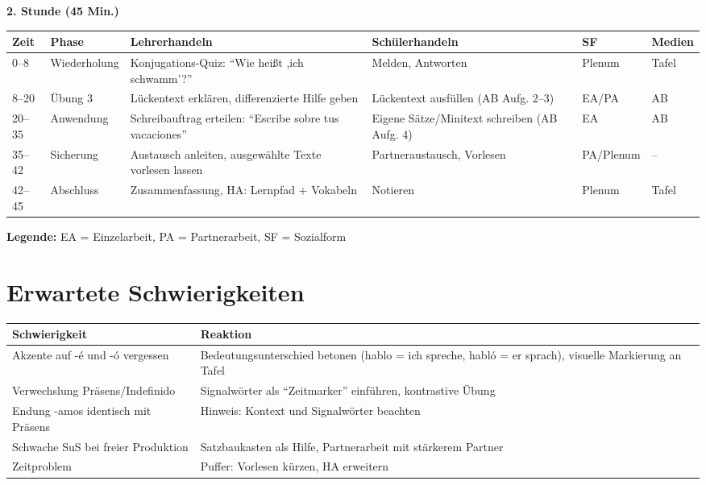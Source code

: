 \documentclass[11pt,a4paper]{article}
\begin{document}
\vspace{1em}

\textbf{2. Stunde (45 Min.)}

\begin{longtable}{|p{1cm}|p{1.5cm}|p{4cm}|p{3cm}|p{2cm}|p{2cm}|}
\hline
\textbf{Zeit} & \textbf{Phase} & \textbf{Lehrerhandeln} & \textbf{Schülerhandeln} & \textbf{SF} & \textbf{Medien} \\
\hline
\endhead

0--8 & Wieder\-holung & Konjugations-Quiz: ``Wie heißt ,ich schwamm'?'' & Melden, Antworten & Plenum & Tafel \\
\hline

8--20 & Übung 3 & Lückentext erklären, differenzierte Hilfe geben & Lückentext ausfüllen (AB Aufg. 2--3) & EA/PA & AB \\
\hline

20--35 & Anwen\-dung & Schreibauftrag erteilen: ``Escribe sobre tus vacaciones'' & Eigene Sätze/Minitext schreiben (AB Aufg. 4) & EA & AB \\
\hline

35--42 & Sicherung & Austausch anleiten, ausgewählte Texte vorlesen lassen & Partneraustausch, Vorlesen & PA/Plenum & -- \\
\hline

42--45 & Abschluss & Zusammenfassung, HA: Lernpfad + Vokabeln & Notieren & Plenum & Tafel \\
\hline
\end{longtable}

\textbf{Legende:} EA = Einzelarbeit, PA = Partnerarbeit, SF = Sozialform

\section{Erwartete Schwierigkeiten}

\begin{tabular}{|p{5cm}|p{8cm}|}
\hline
\textbf{Schwierigkeit} & \textbf{Reaktion} \\
\hline
Akzente auf -é und -ó vergessen & Bedeutungsunterschied betonen (hablo = ich spreche, habló = er sprach), visuelle Markierung an Tafel \\
\hline
Verwechslung Präsens/Indefinido & Signalwörter als ``Zeitmarker'' einführen, kontrastive Übung \\
\hline
Endung -amos identisch mit Präsens & Hinweis: Kontext und Signalwörter beachten \\
\hline
Schwache SuS bei freier Produktion & Satzbaukasten als Hilfe, Partnerarbeit mit stärkerem Partner \\
\hline
Zeitproblem & Puffer: Vorlesen kürzen, HA erweitern \\
\hline
\end{tabular}
\end{document}

